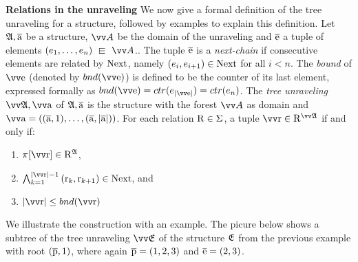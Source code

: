 \noindent
\textbf{Relations in the unraveling}
We now give a formal definition of the tree unraveling for a structure, followed by examples to explain this definition.
Let ${\mathfrak{A}}, \overline{\mathrm{a}}$ be a structure, $\unraveldom{A}$ be the domain of the unraveling and $\overline{\mathrm{e}}$ a tuple of elements $(e_{1}, \ldots, e_{n}) \sqin \unraveldom{A}$..
The tuple $\overline{\mathrm{e}}$ is a \emph{next-chain} if consecutive elements are related by $\mathrm{Next}$, namely $(e_{i}, e_{i+1}) \in \mathrm{Next}$ for all $i < n$.
The \emph{bound} of $\elemtuptuplee$ (denoted by $\bound{\elemtuptuplee}$) is defined to be the counter of its last element, expressed formally as $\bound{\elemtuptuplee} = \ctr{e_{|\elemtuptuplee|}} = \ctr{e_{n}}$.
The \emph{tree unraveling} $\unravel{A}, \elemtuptuplea$ of ${\mathfrak{A}}, \overline{\mathrm{a}}$ is the structure with the forest $\unraveldom{A}$ as domain and $\elemtuptuplea = ((\elemtuplea, 1), \ldots, (\elemtuplea, |\elemtuplea|))$.
For each relation $\mathrm{R} \in \Sigma$, a tuple $\elemtuptupler \in \relR^{\unravel{A}}$ if and only if:\begin{enumerate}
  \item $\pi[\elemtuptupler] \in \relR^{\str{A}}$,
  \item $\bigwedge_{k=1}^{|\elemtuptupler|-1}{(\elemr_{k},\elemr_{k+1}) \in \relNext}$, and
  \item $|\elemtuptupler| \le \bound{\elemtuptupler}$
\end{enumerate}

We illustrate the construction with an example.
The picure below shows a subtree of the tree unraveling $\unravel{E}$ of the structure ${\mathfrak{E}}$ from the previous example with root $(\overline{\mathrm{p}}, 1)$, where again $\overline{\mathrm{p}} = (1,2,3)$ and $\overline{\mathrm{e}} = (2,3)$.
\begin{figure}[H]
  \centering
  
\end{figure}

